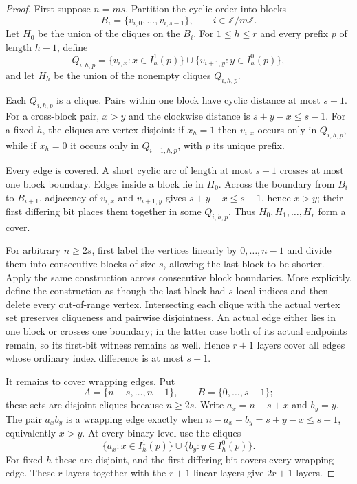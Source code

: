 \documentclass[11pt,a4paper]{article}
\theoremstyle{plain}
\theoremstyle{definition}
\theoremstyle{remark}
\newcommand{\Z}{\mathbb Z}
\begin{document}
\label{pf:binary}
\lembinary*
\begin{proof}
First suppose $n=ms$.  Partition the cyclic order into blocks
\[
 B_i=\{v_{i,0},\ldots,v_{i,s-1}\},\qquad i\in\Z/m\Z.
\]
Let $H_0$ be the union of the cliques on the $B_i$.  For $1\le h\le r$ and every
prefix $p$ of length $h-1$, define
\[
 Q_{i,h,p}=\{v_{i,x}:x\in I_h^1(p)\}
 \cup\{v_{i+1,y}:y\in I_h^0(p)\},
\]
and let $H_h$ be the union of the nonempty cliques $Q_{i,h,p}$.

Each $Q_{i,h,p}$ is a clique.  Pairs within one block have cyclic distance at most
$s-1$.  For a cross-block pair, $x>y$ and the clockwise distance is
$s+y-x\le s-1$.  For a fixed $h$, the cliques are vertex-disjoint: if $x_h=1$ then
$v_{i,x}$ occurs only in $Q_{i,h,p}$, while if $x_h=0$ it occurs only in
$Q_{i-1,h,p}$, with $p$ its unique prefix.

Every edge is covered.  A short cyclic arc of length at most $s-1$ crosses at most one
block boundary.  Edges inside a block lie in $H_0$.  Across the boundary from $B_i$ to
$B_{i+1}$, adjacency of $v_{i,x}$ and $v_{i+1,y}$ gives $s+y-x\le s-1$, hence $x>y$;
their first differing bit places them together in some $Q_{i,h,p}$.  Thus
$H_0,H_1,\ldots,H_r$ form a cover.

For arbitrary $n\ge2s$, first label the vertices linearly by $0,\ldots,n-1$ and divide
them into consecutive blocks of size $s$, allowing the last block to be shorter.  Apply
the same construction across consecutive block boundaries.  More explicitly, define
the construction as though the last block had $s$ local indices and then delete every
out-of-range vertex.  Intersecting each clique with the actual vertex set preserves
cliqueness and pairwise disjointness.  An actual edge either lies in one block or crosses
one boundary; in the latter case both of its actual endpoints remain, so its first-bit
witness remains as well.  Hence $r+1$ layers cover all edges whose ordinary index
difference is at most $s-1$.

It remains to cover wrapping edges.  Put
\[
 A=\{n-s,\ldots,n-1\},\qquad B=\{0,\ldots,s-1\};
\]
these sets are disjoint cliques because $n\ge2s$.  Write $a_x=n-s+x$ and $b_y=y$.
The pair $a_xb_y$ is a wrapping edge exactly when
$n-a_x+b_y=s+y-x\le s-1$, equivalently $x>y$.  At every binary level use the cliques
\[
 \{a_x:x\in I_h^1(p)\}\cup\{b_y:y\in I_h^0(p)\}.
\]
For fixed $h$ these are disjoint, and the first differing bit covers every wrapping
edge.  These $r$ layers together with the $r+1$ linear layers give $2r+1$ layers.
\end{proof}
\end{document}
